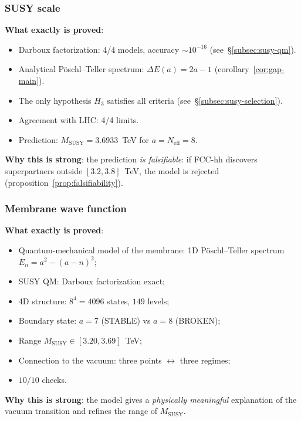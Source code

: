 \documentclass[11pt,a4paper]{article}
\theoremstyle{definition}
\begin{document}
\subsubsection{SUSY scale}

\textbf{What exactly is proved}:
\begin{itemize}
    \item Darboux factorization: 4/4 models, accuracy $\sim 10^{-16}$
          (see~\S\ref{subsec:susy-qm}).
    \item Analytical P\"oschl--Teller spectrum:
          $\Delta E(a) = 2a - 1$ (corollary~\ref{cor:gap-main}).
    \item The only hypothesis $H_3$ satisfies all
          criteria (see~\S\ref{subsec:susy-selection}).
    \item Agreement with LHC: 4/4 limits.
    \item Prediction: $M_{\text{SUSY}} = 3.6933$~TeV
          for $a = N_{\text{eff}} = 8$.
\end{itemize}

\medskip\noindent
\textbf{Why this is strong}: the prediction
\emph{is falsifiable}: if FCC-hh discovers superpartners
outside $[3.2, 3.8]$~TeV, the model is rejected
(proposition~\ref{prop:falsifiability}).

\subsubsection{Membrane wave function}

\textbf{What exactly is proved}:
\begin{itemize}
    \item Quantum-mechanical model of the membrane:
          1D P\"oschl--Teller spectrum $E_n = a^2 - (a-n)^2$;
    \item SUSY QM: Darboux factorization exact;
    \item 4D structure: $8^4 = 4096$ states, $149$ levels;
    \item Boundary state: $a = 7$ (STABLE) vs $a = 8$ (BROKEN);
    \item Range $M_{\text{SUSY}} \in [3.20, 3.69]$~TeV;
    \item Connection to the vacuum: three points $\leftrightarrow$ three regimes;
    \item $10/10$ checks.
\end{itemize}

\medskip\noindent
\textbf{Why this is strong}: the model gives a \emph{physically meaningful}
explanation of the vacuum transition and refines the range of $M_{\text{SUSY}}$.
\end{document}
